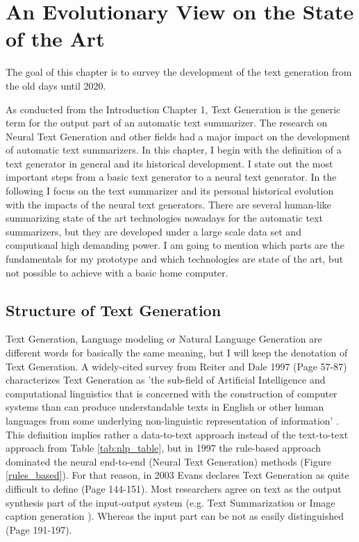 \chapter{An Evolutionary View on the State of the Art}\label{ch:sota}

The goal of this chapter is to survey the development of the text generation from the old days until 2020. 

As conducted from the Introduction Chapter 1, Text Generation is the generic term for the output part of an automatic text summarizer. The research on Neural Text Generation and other fields had a major impact on the development of automatic text summarizers. In this chapter, I begin with the definition of a text generator in general and its historical development. I state out the most important steps from a basic text generator to a neural text generator. In the following I focus on the text summarizer and its personal historical evolution with the impacts of the neural text generators. There are several human-like summarizing state of the art technologies nowadays for the automatic text summarizers, but they are developed under a large scale data set and computional high demanding power. I am going to mention which parts are the fundamentals for my prototype and which technologies are state of the art, but not possible to achieve with a basic home computer.

\section{Structure of Text Generation }\label{ss:history}

Text Generation, Language modeling or Natural Language Generation are different words for basically the same meaning, but I will keep the denotation of Text Generation. A widely-cited survey from Reiter and Dale 1997 (Page 57-87) \cite{reiter} characterizes Text Generation as 'the sub-field of Artificial Intelligence and computational linguistics that is concerned with the construction of computer systems than can produce understandable texts in English or other human languages from some underlying non-linguistic representation of information' \cite{reiter}. This definition implies rather a data-to-text approach instead of the text-to-text approach from Table \ref{tab:nlp_table}, but in 1997 the rule-based approach dominated the neural end-to-end (Neural Text Generation) methods (Figure \ref{rules_based}). For that reason, in 2003 Evans declares Text Generation as quite difficult to define \cite{evans} (Page 144-151). Most researchers agree on text as the output synthesis part of the input-output system (e.g. Text Summarization or Image caption generation \cite{mitchell}). Whereas the input part can be not as easily distinguished \cite{mcdonald} (Page 191-197).

